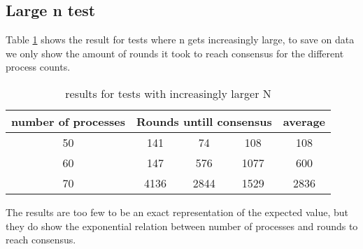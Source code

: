 \subsection{Large n test}
Table \ref{table:resultsLargeN} shows the result for tests where n gets increasingly large, to save on data we only show the amount of rounds it took to reach consensus for the different process counts.



\begin{table}[h]
	\begin{tabular}{ | c | c  | c | c |  c |}
		\hline
  		 number of processes & \multicolumn{3}{|c|}{Rounds untill consensus }  & average\\
		\hline
 		50 & 141 & 74 & 108  & 108   \\
		\hline
		60  & 147  &576 & 1077  & 600     \\
		\hline
		70  & 4136 & 2844 & 1529  & 2836    \\
		\hline
	\end{tabular}
	\caption{results for tests with increasingly larger N}	
	\label{table:resultsLargeN}
\end{table}

The results are too few to be an exact representation of the expected value, but they do show the exponential relation between number of processes and rounds to reach consensus.
